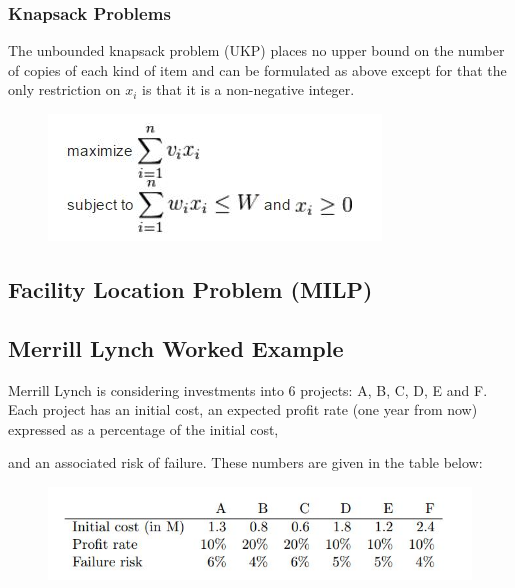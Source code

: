 \documentclass{beamer}
\begin{document}
\begin{frame}
	\frametitle{Knapsack Problems}
	\Large
The unbounded knapsack problem (UKP) places no upper bound on the number of copies of each kind of item and can be formulated as above except for that the only restriction on $x_i$ is that it is a non-negative integer.
	\begin{figure}
\centering
\includegraphics[width=0.7\linewidth]{unboundedknapsack}
\caption{}
\label{fig:unboundedknapsack}
\end{figure}

\end{frame}
\subsection{ Facility Location Problem (MILP) }
\begin{frame}
\end{frame}
\subsection{ Merrill Lynch Worked Example}
\begin{frame}
	Merrill Lynch is considering investments into 6 projects: A, B, C, D, E and F. Each project has an
	initial cost, an expected profit rate (one year from now) expressed as a percentage of the initial cost,

	and an associated risk of failure. These numbers are given in the table below:
\begin{figure}
\centering
\includegraphics[width=0.7\linewidth]{MErrillLynchExample}
\caption{}
\label{fig:MErrillLynchExample}
\end{figure}

\end{frame}
\end{document}
